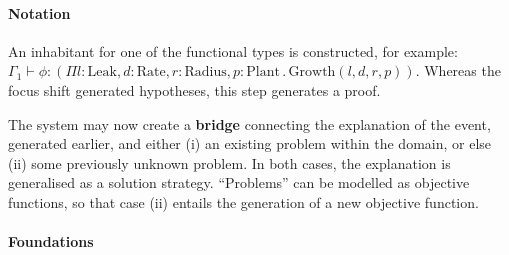 \paragraph{\textbf{\upshape Notation}}

An inhabitant for one of the functional types is constructed, for
example: $\Gamma_1 \vdash \phi : (\Pi l:\mathrm{Leak},
d:\mathrm{Rate}, r:\mathrm{Radius}, p:\mathrm{Plant} \mathbin{.}
\mathrm{Growth}(l,d,r,p))$.  Whereas the focus shift generated
hypotheses, this step generates a proof.

\begin{defn}\label{def:bridge}
\hypertarget{def:bridge}{}The system may now create a \textbf{bridge}
connecting the explanation of the event, generated earlier, and either
(i) an existing problem within the domain, or else (ii) some
previously unknown problem.  In both cases, the explanation is
generalised as a solution strategy.  ``Problems'' can be modelled as
objective functions, so that case (ii) entails the generation of a new
objective function.
\end{defn}
\paragraph{\textbf{\upshape Foundations}}
                                         

